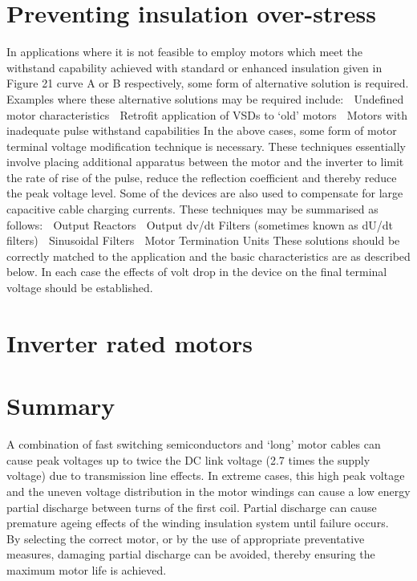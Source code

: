 \section{Preventing insulation over-stress}

In applications where it is not feasible to employ motors which meet the withstand capability
achieved with standard or enhanced insulation given in Figure 21 curve A or B respectively,
some form of alternative solution is required.
Examples where these alternative solutions may be required include:
 Undefined motor characteristics
 Retrofit application of VSDs to ‘old’ motors
 Motors with inadequate pulse withstand capabilities
In the above cases, some form of motor terminal voltage modification technique is necessary.
These techniques essentially involve placing additional apparatus between the motor and the
inverter to limit the rate of rise of the pulse, reduce the reflection coefficient and thereby reduce
the peak voltage level. Some of the devices are also used to compensate for large capacitive
cable charging currents. These techniques may be summarised as follows:
 Output Reactors
 Output dv/dt Filters (sometimes known as dU/dt filters)
 Sinusoidal Filters
 Motor Termination Units
These solutions should be correctly matched to the application and the basic characteristics
are as described below.
In each case the effects of volt drop in the device on the final terminal voltage should be
established.

\section{Inverter rated motors}








\section{Summary}

A combination of fast switching semiconductors and ‘long’ motor cables can cause
peak voltages up to twice the DC link voltage (2.7 times the supply voltage) due to
transmission line effects. In extreme cases, this high peak voltage and the uneven
voltage distribution in the motor windings can cause a low energy partial discharge
between turns of the first coil. Partial discharge can cause premature ageing effects of
the winding insulation system until failure occurs.
 By selecting the correct motor, or by the use of appropriate preventative measures,
damaging partial discharge can be avoided, thereby ensuring the maximum motor life
is achieved.



